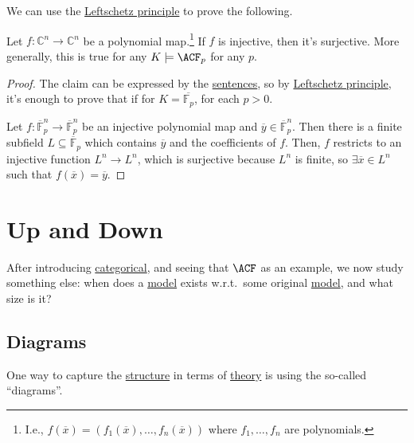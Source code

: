 We can use the \hyperref[thm:Leftschetz-principle]{Leftschetz principle} to prove the following.

\begin{theorem}\label{thm:Ax-Grothendieck}
	Let \(f\colon \mathbb{C} ^n \to \mathbb{C} ^n\) be a polynomial map.\footnote{I.e., \(f(\overline{x} ) = (f_1(\overline{x} ), \dots , f_n(\overline{x} ))\) where \(f_1, \dots , f_n\) are polynomials.} If \(f\) is injective, then it's surjective. More generally, this is true for any \(K \models \ACF_p\) for any \(p\).
\end{theorem}
\begin{proof}
	The claim can be expressed by the \hyperref[def:sentence]{sentences}, so by \hyperref[thm:Leftschetz-principle]{Leftschetz principle}, it's enough to prove that if for \(K = \overline{\mathbb{F}_p}\), for each \(p > 0\).

	Let \(f\colon \overline{\mathbb{F}}_p^n \to \overline{\mathbb{F}}_p^n\) be an injective polynomial map and \(\overline{y} \in \overline{\mathbb{F}}_p^n\). Then there is a finite subfield \(L \subseteq \overline{\mathbb{F}} _p \) which contains \(\overline{y}\) and the coefficients of \(f\). Then, \(f\) restricts to an injective function \(L^n \to L^n\), which is surjective because \(L^n\) is finite, so \(\exists \overline{x} \in L^n\) such that \(f(\overline{x} ) = \overline{y} \).
\end{proof}

\section{Up and Down}
After introducing \hyperref[def:categorical]{categorical}, and seeing that \(\ACF\) as an example, we now study something else: when does a \hyperref[def:model]{model} exists w.r.t.\ some original \hyperref[def:model]{model}, and what size is it?

\subsection{Diagrams}
One way to capture the \hyperref[def:structure]{structure} in terms of \hyperref[def:theory]{theory} is using the so-called ``diagrams''.

